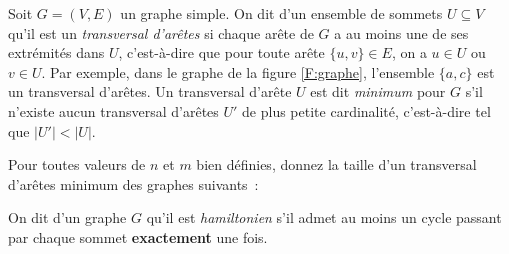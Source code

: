 \documentclass[12pt,addpoints]{exam}
\begin{document}
\begin{questions}

\question
Soit $G = (V,E)$ un graphe simple. On dit d'un ensemble de sommets $U \subseteq V$ qu'il est un \emph{transversal d'arêtes} si chaque arête de $G$ a au moins une de ses extrémités dans $U$, c'est-à-dire que pour toute arête $\{u,v\} \in E$, on a $u \in U$ ou $v \in U$. Par exemple, dans le graphe de la figure \ref{F:graphe}, l'ensemble $\{a,c\}$ est un transversal d'arêtes. Un transversal d'arête $U$ est dit \emph{minimum} pour $G$ s'il n'existe aucun transversal d'arêtes $U'$ de plus petite cardinalité, c'est-à-dire tel que $|U'| < |U|$.

Pour toutes valeurs de $n$ et $m$ bien définies, donnez la taille d'un transversal d'arêtes minimum des graphes suivants~:

\question
On dit d'un graphe $G$ qu'il est \emph{hamiltonien} s'il admet au moins un cycle passant par chaque sommet \textbf{exactement} une fois.


\end{questions}
\end{document}
